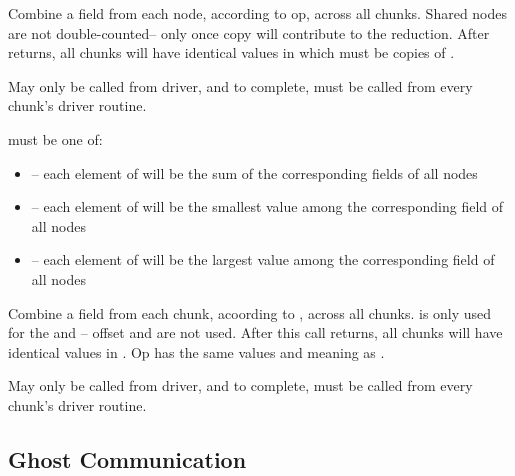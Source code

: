 \documentclass[10pt]{article}
\begin{document}

Combine a field from each node, according to op, across all chunks.
Shared nodes are not double-counted-- only once copy will contribute to the
reduction.  After  returns, all chunks will have identical
values in  which must be  copies of .

     May only be called from driver, and to complete, must be called
     from every chunk's driver routine.

      must be one of:

\begin{itemize}
        \item {}-- each element of  will be the sum 
of the corresponding fields of all nodes
        \item {}-- each element of  will be the 
smallest value among the corresponding field of all nodes
        \item {}-- each element of  will be the largest 
value among the corresponding field of all nodes
\end{itemize}



     Combine a field from each chunk, acoording to , across all chunks.
 is only used for the  and -- offset and
 are not used.  After this call returns, all chunks will have
identical values in .  Op has the same values and meaning as
.

     May only be called from driver, and to complete, must be called
     from every chunk's driver routine.



\subsection{Ghost Communication}
\end{document}

